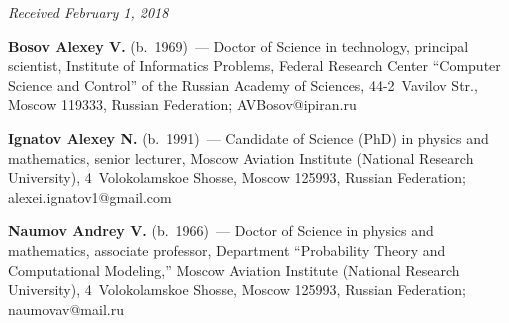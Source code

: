 \vspace*{-6pt}

\hfill{\small\textit{Received February 1, 2018}}


\vspace*{-12pt}

\Contr

\noindent
\textbf{Bosov Alexey V.} (b.\ 1969)~--- Doctor of Science in technology, principal scientist, Institute 
of Informatics Problems, Federal Research Center ``Computer Science and Control'' of the Russian 
Academy of Sciences, 44-2~Vavilov Str., Moscow 119333, Russian Federation; 
\mbox{AVBosov@ipiran.ru}

\vspace*{3pt}

\noindent
\textbf{Ignatov Alexey N.} (b.\ 1991)~--- Candidate of Science (PhD) in physics and mathematics, 
senior lecturer, Moscow Aviation Institute (National Research University), 4~Volokolamskoe Shosse, 
Moscow 125993, Russian Federation; \mbox{alexei.ignatov1@gmail.com}

\vspace*{3pt}

\noindent
\textbf{Naumov Andrey V.} (b.\ 1966)~--- Doctor of Science in physics and mathematics, associate 
professor, Department ``Probability Theory and Computational Modeling,'' Moscow Aviation Institute 
(National Research University), 4~Volokolamskoe Shosse, Moscow 125993, Russian Federation; 
\mbox{naumovav@mail.ru}

\label{end\stat}

\renewcommand{\bibname}{\protect\rm Литература}       